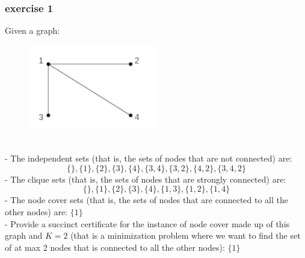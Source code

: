 \documentclass[12pt]{article}
\begin{document}
\subsubsection{exercise 1}
Given a graph:
\begin{figure}[ht]
  \centering
  \includegraphics[width=0.5\textwidth]{img/es1.png}
\end{figure}
\\
- The independent sets (that is, the sets of nodes that are not connected) are: $$\{\}, \{1\}, \{2\}, \{3\}, \{4\}, \{3,4\}, \{3,2\}, \{4,2\}, \{3,4,2\}$$
- The clique sets (that is, the sets of nodes that are strongly connected) are: 
$$ \{\}, \{1\}, \{2\}, \{3\}, \{4\}, \{1,3\}, \{1,2\}, \{1,4\} $$
- The node cover sets (that is, the sets of nodes that are connected to all the other nodes) are:
$\{1\}$\\
- Provide a succinct certificate for the instance of node cover made up of this graph and $K=2$ (that is a minimization problem where we want to find the set of at max 2 nodes that is connected to all the other nodes):
$\{1\}$
\end{document}
